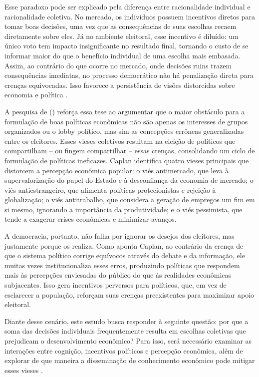 Esse paradoxo pode ser explicado pela diferença entre racionalidade individual e racionalidade coletiva. No mercado, os indivíduos possuem incentivos diretos para tomar boas decisões, uma vez que as consequências de suas escolhas recaem diretamente sobre eles. Já no ambiente eleitoral, esse incentivo é diluído: um único voto tem impacto insignificante no resultado final, tornando o custo de se informar maior do que o benefício individual de uma escolha mais embasada. Assim, ao contrário do que ocorre no mercado, onde decisões ruins trazem consequências imediatas, no processo democrático não há penalização direta para crenças equivocadas. Isso favorece a persistência de visões distorcidas sobre economia e política \cite{bastiat1859sofismas,downs1957economic,The_Myth_of_the_Rational_Voter}.

A pesquisa de  (\citeyear{The_Myth_of_the_Rational_Voter}) reforça essa tese ao argumentar que o maior obstáculo para a formulação de boas políticas econômicas não são apenas os interesses de grupos organizados ou o lobby político, mas sim as concepções errôneas generalizadas entre os eleitores. Esses vieses coletivos resultam na eleição de políticos que compartilham – ou fingem compartilhar – essas crenças, consolidando um ciclo de formulação de políticas ineficazes. Caplan identifica quatro vieses principais que distorcem a percepção econômica popular: o viés antimercado, que leva à supervalorização do papel do Estado e à desconfiança da economia de mercado; o viés antiestrangeiro, que alimenta políticas protecionistas e rejeição à globalização; o viés antitrabalho, que considera a geração de empregos um fim em si mesmo, ignorando a importância da produtividade; e o viés pessimista, que tende a exagerar crises econômicas e minimizar avanços.

A democracia, portanto, não falha por ignorar os desejos dos eleitores, mas justamente porque os realiza. Como aponta Caplan, ao contrário da crença de que o sistema político corrige equívocos através do debate e da informação, ele muitas vezes institucionaliza esses erros, produzindo políticas que respondem mais às percepções enviesadas do público do que às realidades econômicas subjacentes. Isso gera incentivos perversos para políticos, que, em vez de esclarecer a população, reforçam suas crenças preexistentes para maximizar apoio eleitoral.

Diante desse cenário, este estudo busca responder à seguinte questão: por que a soma das decisões individuais frequentemente resulta em escolhas coletivas que prejudicam o desenvolvimento econômico? Para isso, será necessário examinar as interações entre cognição, incentivos políticos e percepção econômica, além de explorar de que maneira a disseminação de conhecimento econômico pode mitigar esses vieses \cite{positive_economics_friedman,Judgment_under_Uncertainty,kahneman2011thinking}.

